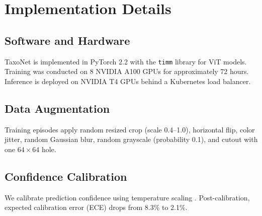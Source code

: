 \section{Implementation Details}

\label{sec:implementation}

\subsection{Software and Hardware}

TaxoNet is implemented in PyTorch 2.2 with the \texttt{timm} library for
ViT models. Training was conducted on 8 NVIDIA A100 GPUs for
approximately 72 hours. Inference is deployed on NVIDIA T4 GPUs behind a
Kubernetes load balancer.

\subsection{Data Augmentation}

Training episodes apply random resized crop (scale 0.4--1.0), horizontal
flip, color jitter, random Gaussian blur, random grayscale (probability
0.1), and cutout with one $64 \times 64$ hole.

\subsection{Confidence Calibration}

We calibrate prediction confidence using temperature scaling
\citep{guo2017calibration}. Post-calibration, expected calibration error
(ECE) drops from 8.3\% to 2.1\%.


